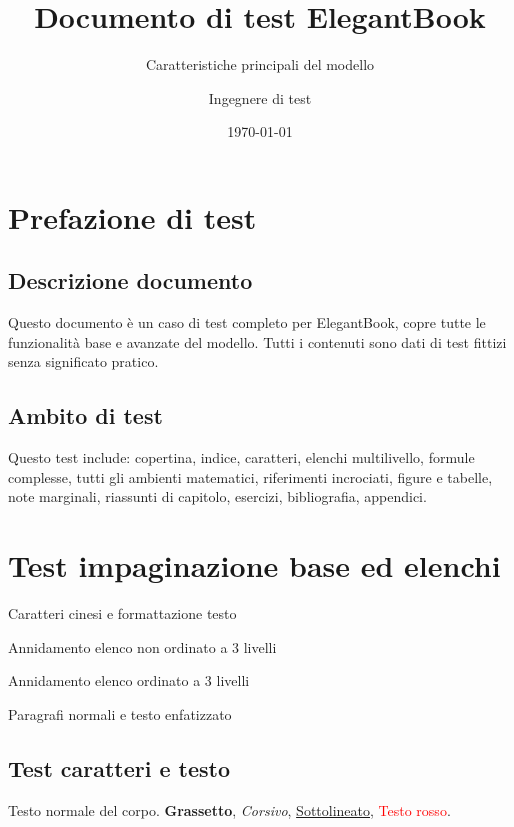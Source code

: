 \documentclass[it]{../../elegantbook}
\title{Documento di test ElegantBook}
\subtitle{Caratteristiche principali del modello}
\author{Ingegnere di test}
\institute{Gruppo di test del modello}
\date{\today}
\begin{document}
\maketitle
\frontmatter
\tableofcontents

\setcounter{page}{0}
\chapter*{Prefazione di test}
\section*{Descrizione documento}
Questo documento è un caso di test completo per ElegantBook, copre tutte le funzionalità base e avanzate del modello. Tutti i contenuti sono dati di test fittizi senza significato pratico.
\newpage
\section*{Ambito di test}
Questo test include: copertina, indice, caratteri, elenchi multilivello, formule complesse, tutti gli ambienti matematici, riferimenti incrociati, figure e tabelle, note marginali, riassunti di capitolo, esercizi, bibliografia, appendici.

\mainmatter

\chapter{Test impaginazione base ed elenchi}
\begin{introduction}
\item Caratteri cinesi e formattazione testo
\item Annidamento elenco non ordinato a 3 livelli
\item Annidamento elenco ordinato a 3 livelli
\item Paragrafi normali e testo enfatizzato
\end{introduction}

\section{Test caratteri e testo}
Testo normale del corpo. \textbf{Grassetto}, \textit{Corsivo}, \underline{Sottolineato}, \textcolor{red}{Testo rosso}.
\end{document}
